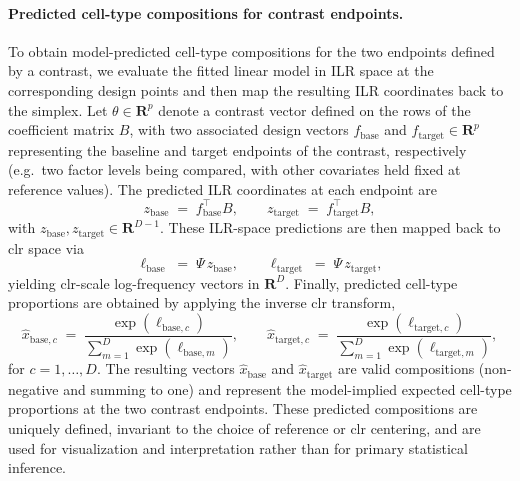 \documentclass{article}
\begin{document}
\paragraph{Predicted cell-type compositions for contrast endpoints.}
To obtain model-predicted cell-type compositions for the two endpoints
defined by a contrast, we evaluate the fitted linear model in ILR space
at the corresponding design points and then map the resulting ILR
coordinates back to the simplex. Let $\theta \in \mathbf{R}^{p}$ denote a
contrast vector defined on the rows of the coefficient matrix $B$, with
two associated design vectors $f_{\mathrm{base}}$ and $f_{\mathrm{target}}
\in \mathbf{R}^{p}$ representing the baseline and target endpoints of the
contrast, respectively (e.g.\ two factor levels being compared, with
other covariates held fixed at reference values). The predicted ILR
coordinates at each endpoint are
\begin{equation}
z_{\mathrm{base}} \;=\; f_{\mathrm{base}}^{\top} B,
\qquad
z_{\mathrm{target}} \;=\; f_{\mathrm{target}}^{\top} B,
\end{equation}
with $z_{\mathrm{base}}, z_{\mathrm{target}} \in \mathbf{R}^{D-1}$.
These ILR-space predictions are then mapped back to clr space via
\begin{equation}
\ell_{\mathrm{base}} \;=\; \Psi\, z_{\mathrm{base}},
\qquad
\ell_{\mathrm{target}} \;=\; \Psi\, z_{\mathrm{target}},
\end{equation}
yielding clr-scale log-frequency vectors in $\mathbf{R}^{D}$. Finally,
predicted cell-type proportions are obtained by applying the inverse
clr transform,
\begin{equation}
\hat{x}_{\mathrm{base},c}
\;=\;
\frac{\exp\!\left(\ell_{\mathrm{base},c}\right)}
     {\sum_{m=1}^{D} \exp\!\left(\ell_{\mathrm{base},m}\right)},
\qquad
\hat{x}_{\mathrm{target},c}
\;=\;
\frac{\exp\!\left(\ell_{\mathrm{target},c}\right)}
     {\sum_{m=1}^{D} \exp\!\left(\ell_{\mathrm{target},m}\right)},
\end{equation}
for $c = 1,\dots,D$. The resulting vectors
$\hat{x}_{\mathrm{base}}$ and $\hat{x}_{\mathrm{target}}$ are valid
compositions (non-negative and summing to one) and represent the
model-implied expected cell-type proportions at the two contrast
endpoints. These predicted compositions are uniquely defined, invariant
to the choice of reference or clr centering, and are used for
visualization and interpretation rather than for primary statistical
inference.
\end{document}
